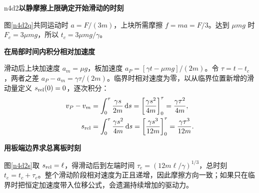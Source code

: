 \begin{drillsolution}{n4d2}\textbf{以静摩擦上限确定开始滑动的时刻}\par\nobreak
图\ref{n4d2q}共同运动时 $a=F/(3m)$，上块所需摩擦 $f=ma=F/3$。达到 $\mu mg$ 时 $F_c=3\mu mg$，所以 $t_c=3\mu mg/\gamma$。


\par\medskip{}\noindent\textbf{在局部时间内积分相对加速度}\par\nobreak
滑动后上块加速度 $a_m=\mu g$，板加速度 $a_P=[\gamma t-\mu mg]/(2m)$。令 $\tau=t-t_c$，两者之差 $a_P-a_m=\gamma\tau/(2m)$。临界时相对速度为零，以从临界位置新增的滑动量定义 $s_{\rm rel}(0)=0$，逐次积分：
\begin{align*}
v_P-v_m&=\int_0^\tau\frac{\gamma s}{2m}\mathop{}\!\mathrm d s
=\left[\frac{\gamma s^2}{4m}\right]_0^\tau
=\frac{\gamma\tau^2}{4m},\\
s_{\rm rel}&=\int_0^\tau\frac{\gamma s^2}{4m}\mathop{}\!\mathrm d s
=\left[\frac{\gamma s^3}{12m}\right]_0^\tau
=\frac{\gamma\tau^3}{12m}.
\end{align*}



\par\medskip{}\noindent\textbf{用板端边界求总离板时刻}\par\nobreak
图\ref{n4d2s}取 $s_{\rm rel}=\ell$，得滑动后到左端时间 $\tau_e=(12m\ell/\gamma)^{1/3}$，总时刻 $t_e=t_c+\tau_e$。整个滑动阶段相对速度为正且递增，因此摩擦方向一致；如果只在临界时把恒定加速度带入位移公式，会遗漏持续增加的驱动力。
\end{drillsolution}

